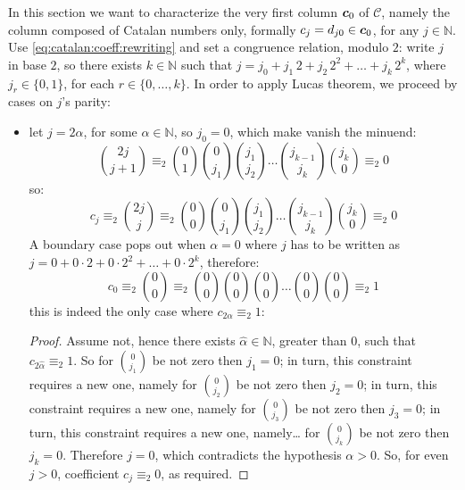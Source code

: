 In this section we want to characterize the very first column $\boldsymbol{c}_{0}$
of $\mathcal{C}$, namely the column composed of Catalan numbers only,
formally $c_{j}=d_{j0}\in\boldsymbol{c}_{0}$, for any $j\in\mathbb{N}$.  
Use \autoref{eq:catalan:coeff:rewriting}
and set a congruence relation, modulo $2$: write $j$ in base $2$, 
so there exists $k\in\mathbb{N}$ such that 
$j=j_{0} + j_{1}\,2 + j_{2}\,2^{2} + \ldots + j_{k}\,2^{k}$, where
$j_{r}\in\lbrace0,1\rbrace$, for each $r\in\lbrace0,\ldots,k\rbrace$. 
In order to apply Lucas theorem, we proceed by cases on $j$'s parity:
\begin{itemize}
    \item let $j=2\alpha$, for some $\alpha\in\mathbb{N}$, so $j_{0}=0$,
        which make vanish the minuend:
        \begin{displaymath}
            {{2j}\choose{j+1}}
            \equiv_{2} {{0}\choose{1}}{{0}\choose{j_{1}}}{{j_{1}}\choose{j_{2}}}
                \ldots{{j_{k-1}}\choose{j_{k}}}{{j_{k}}\choose{0}}\equiv_{2}0
        \end{displaymath}
        so:
        \begin{displaymath}
            c_{j}\equiv_{2}{{2j}\choose{j}}
            \equiv_{2} {{0}\choose{0}}{{0}\choose{j_{1}}}{{j_{1}}\choose{j_{2}}}
                \ldots{{j_{k-1}}\choose{j_{k}}}{{j_{k}}\choose{0}}\equiv_{2}0
        \end{displaymath}
        A boundary case pops out when $\alpha=0$ where $j$ has to be written as 
        $j=0 + 0\cdot2 + 0\cdot2^{2} + \ldots + 0\cdot2^{k}$, therefore:
        \begin{displaymath}
            c_{0}\equiv_{2}{{0}\choose{0}}
            \equiv_{2} {{0}\choose{0}}{{0}\choose{0}}{{0}\choose{0}}
                \ldots{{0}\choose{0}}{{0}\choose{0}}\equiv_{2}1
        \end{displaymath}
        this is indeed the only case where $c_{2\alpha} \equiv_{2}1$:
        \begin{proof}
            Assume not, hence there exists $\hat{\alpha}\in\mathbb{N}$, greater than $0$,
            such that $c_{2\hat{\alpha}} \equiv_{2}1$. So for ${{0}\choose{j_{1}}}$
            be not zero then $j_{1}=0$; in turn, this constraint requires a new one, namely
            for ${{0}\choose{j_{2}}}$ be not zero then $j_{2}=0$; 
            in turn, this constraint requires a new one, namely
            for ${{0}\choose{j_{3}}}$ be not zero then $j_{3}=0$; 
            in turn, this constraint requires a new one, namely\ldots
            for ${{0}\choose{j_{k}}}$ be not zero then $j_{k}=0$.
            Therefore $j=0$, which contradicts the hypothesis $\alpha>0$. So,
            for even $j > 0$, coefficient $c_{j}\equiv_{2}0$, as required.
        \end{proof}


\end{itemize}
